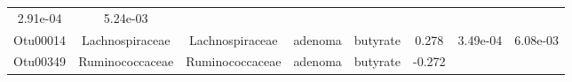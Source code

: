 \documentclass[11pt,]{article}
\begin{document}
\begin{longtable}[]{@{}cccccccc@{}}
\begin{minipage}[t]{0.08\columnwidth}
2.91e-04\strut
\end{minipage} & \begin{minipage}[t]{0.08\columnwidth}\centering\strut
5.24e-03\strut
\end{minipage}\tabularnewline
\begin{minipage}[t]{0.08\columnwidth}\centering\strut
Otu00014\strut
\end{minipage} & \begin{minipage}[t]{0.15\columnwidth}\centering\strut
Lachnospiraceae\strut
\end{minipage} & \begin{minipage}[t]{0.15\columnwidth}\centering\strut
Lachnospiraceae\strut
\end{minipage} & \begin{minipage}[t]{0.08\columnwidth}\centering\strut
adenoma\strut
\end{minipage} & \begin{minipage}[t]{0.09\columnwidth}\centering\strut
butyrate\strut
\end{minipage} & \begin{minipage}[t]{0.07\columnwidth}\centering\strut
0.278\strut
\end{minipage} & \begin{minipage}[t]{0.08\columnwidth}\centering\strut
3.49e-04\strut
\end{minipage} & \begin{minipage}[t]{0.08\columnwidth}\centering\strut
6.08e-03\strut
\end{minipage}\tabularnewline
\begin{minipage}[t]{0.08\columnwidth}\centering\strut
Otu00349\strut
\end{minipage} & \begin{minipage}[t]{0.15\columnwidth}\centering\strut
Ruminococcaceae\strut
\end{minipage} & \begin{minipage}[t]{0.15\columnwidth}\centering\strut
Ruminococcaceae\strut
\end{minipage} & \begin{minipage}[t]{0.08\columnwidth}\centering\strut
adenoma\strut
\end{minipage} & \begin{minipage}[t]{0.09\columnwidth}\centering\strut
butyrate\strut
\end{minipage} & \begin{minipage}[t]{0.07\columnwidth}\centering\strut
-0.272\strut
\end{minipage} & \begin{minipage}[t]{0.08\columnwidth}\centering\strut

\end{minipage}
\end{longtable}
\end{document}
